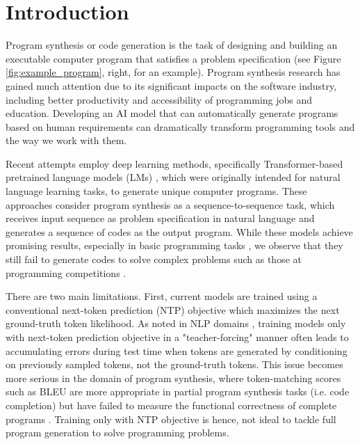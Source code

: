 \documentclass{article}
\begin{document}
\newpage
\tableofcontents
\newpage

\section{Introduction}

Program synthesis or code generation is the task of designing and building an executable computer program that satisfies a problem specification (see Figure \ref{fig:example_program}, right, for an example). 
Program synthesis research has gained much attention due to its significant impacts on the software industry, including better productivity and accessibility of programming jobs and education. 
Developing an AI model that can automatically generate programs based on human requirements can dramatically transform programming tools and the way we work with them. 

Recent attempts employ deep learning methods, specifically Transformer-based pretrained language models (LMs) \citep{vaswani2017attention, brown2020language}, which were originally intended for natural language learning tasks, to generate unique computer programs. 
These approaches \citep{ hendrycksapps2021, chen2021evaluating, austin2021program} consider program synthesis as a sequence-to-sequence task, which receives input sequence as problem specification in natural language and generates a sequence of codes as the output program.
While these models achieve promising results, especially in basic programming tasks \citep{chen2021evaluating, austin2021program}, we observe that they still fail to generate codes to solve complex problems such as those at programming competitions \citep{hendrycksapps2021, li2022competition}.

There are two main limitations. 
First, current models are trained using a conventional next-token prediction (NTP) objective which maximizes the next ground-truth token likelihood. 
As noted in NLP domains \citep{bengio2015scheduled, DBLP:journals/corr/RanzatoCAZ15}, training models only with next-token prediction objective in a "teacher-forcing" manner often leads to accumulating errors during test time when tokens are generated by conditioning on previously sampled tokens, not the ground-truth tokens.
This issue becomes more serious in the domain of program synthesis, where token-matching scores such as BLEU \citep{papineni2002bleu, ren2020codebleu} are more appropriate in partial program synthesis tasks (i.e. code completion) \citep{csn} but have failed to measure the functional correctness of complete programs \citep{hendrycksapps2021, chen2021evaluating}. 
Training only with NTP objective is hence, not ideal to tackle full program generation to solve programming problems. 
\end{document}
